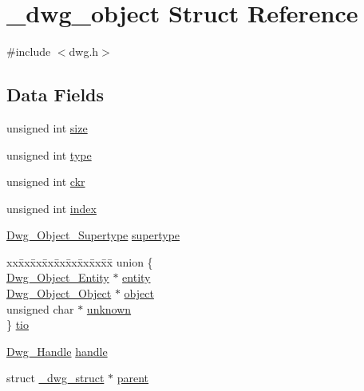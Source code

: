 \hypertarget{struct__dwg__object}{\section{\-\_\-dwg\-\_\-object \-Struct \-Reference}
\label{struct__dwg__object}
}


{\ttfamily \#include $<$dwg.\-h$>$}

\subsection*{\-Data \-Fields}
\begin{DoxyCompactItemize}
\item 
unsigned int \hyperlink{struct__dwg__object_a1c48ac685467ac87ca01defe09d263ae}{size}
\item 
unsigned int \hyperlink{struct__dwg__object_a6ac13d29d4d6e3490c2fa8ede86e4e24}{type}
\item 
unsigned int \hyperlink{struct__dwg__object_a6bb160ffa5f4acf4f8866132a93659e5}{ckr}
\item 
unsigned int \hyperlink{struct__dwg__object_a40fb9343223fe3655090c04899971854}{index}
\item 
\hyperlink{dwg_8h_a62f2abd46a1191c6e8e0af5e3477245f}{\-Dwg\-\_\-\-Object\-\_\-\-Supertype} \hyperlink{struct__dwg__object_a16ed7e17d7e2380ed819252ddaabd5e1}{supertype}
\item 
\begin{tabbing}
xx\=xx\=xx\=xx\=xx\=xx\=xx\=xx\=xx\=\kill
union \{\\
\>\hyperlink{dwg_8h_a038007ec910858e4a6dc2c1d3d3479b3}{Dwg\_Object\_Entity} $\ast$ \hyperlink{struct__dwg__object_a561b7406253ad9b43715956b01cf7f47}{entity}\\
\>\hyperlink{dwg_8h_adb1bd2ccc83d90952d10ccfcbcd88652}{Dwg\_Object\_Object} $\ast$ \hyperlink{struct__dwg__object_a20a29e0e5e00c61e688101701ccd2397}{object}\\
\>unsigned char $\ast$ \hyperlink{struct__dwg__object_a7e59deccc06272bde2e3c9c3d1431c1f}{unknown}\\
\} \hyperlink{struct__dwg__object_a3b385cea0094fade62e7c1035ccea982}{tio}\\

\end{tabbing}\item 
\hyperlink{dwg_8h_abeae9f49b46e36263ebcece699cfc8ef}{\-Dwg\-\_\-\-Handle} \hyperlink{struct__dwg__object_a70641bb58921286a37ff692a6f674792}{handle}
\item 
struct \hyperlink{struct__dwg__struct}{\-\_\-dwg\-\_\-struct} $\ast$ \hyperlink{struct__dwg__object_a1a8d4539fc2e20c1b5c62503cdbb6b87}{parent}
\end{DoxyCompactItemize}


